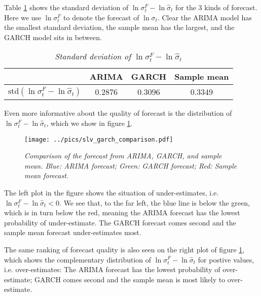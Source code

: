 Table \ref{tab:slv_garch_comparison} shows the standard deviation of
$\ln \sigma^F_t - \ln \hat{\sigma}_t$ for the 3 kinds of
forecast. Here we use $\ln \sigma^F_t$ to denote the forecast of $\ln
\sigma_t$. Clear the ARIMA model has the smallest standard deviation,
the sample mean has the largest, and the GARCH model sits in between.
\begin{table}[htb!]
  \centering
  \begin{tabular}{|c|c|c|c|}
    \hline
    & ARIMA & GARCH & Sample mean \\
    \hline
    $\text{std}(\ln \sigma^F_t - \ln \hat{\sigma}_t)$ &
    0.2876  &  0.3096 &   0.3349 \\
    \hline
  \end{tabular}
  \caption{\small \it Standard deviation of $\ln\sigma^F_t -
    \ln\hat{\sigma}_t$}
  \label{tab:slv_garch_comparison}
\end{table}
Even more informative about the quality of forecast is the
distribution of $\ln \sigma^F_t - \ln \hat{\sigma}_t$, which we show
in figure \ref{fig:slv_garch_comparison}.
\begin{figure}[htb!]
  \centering
  \texttt{[image: ../pics/slv\_garch\_comparison.pdf]}
  \caption{\small \it Comparison of the forecast from ARIMA, GARCH,
    and sample mean. Blue: ARIMA forecast; Green: GARCH forecast; Red:
    Sample mean forecast.}
  \label{fig:slv_garch_comparison}
\end{figure}
The left plot in the figure shows the situation of under-estimates,
i.e. $\ln \sigma^F_t - \ln \hat{\sigma}_t < 0$. We see that, to the
far left, the blue line is below the green, which is in turn below the
red, meaning the ARIMA forecast has the lowest probability of
under-estimate. The GARCH forecast comes second and the sample
mean forecast under-estimates most.

The same ranking of forecast quality is also seen on the right plot of
figure \ref{fig:slv_garch_comparison}, which shows the complementary
distribution of $\ln \sigma^F_t - \ln \hat{\sigma}_t$ for postive
values, i.e. over-estimates: The ARIMA forecast has the lowest
probability of over-estimate; GARCH comes second and the sample mean
is most likely to over-estimate.

